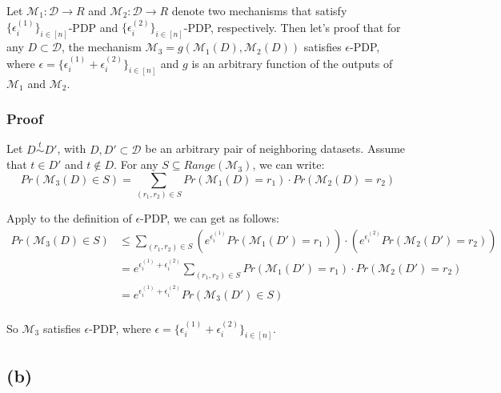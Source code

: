 \documentclass[a4paper,12pt]{article}
\begin{document}
Let $\mathcal{M}_1: \mathcal{D} \to R$ and $\mathcal{M}_2: \mathcal{D} \to R$ denote two mechanisms that satisfy $\{\epsilon_{i}^{(1)}\}_{i\in [n]}$-PDP and $\{\epsilon_{i}^{(2)}\}_{i\in [n]}$-PDP, respectively. Then let's proof that for any $D \subset \mathcal{D}$, the mechanism $\mathcal{M}_3 = g(\mathcal{M}_1(D), \mathcal{M}_2(D))$ satisfies $\epsilon$-PDP, where $\epsilon = \{\epsilon_{i}^{(1)} + \epsilon_{i}^{(2)}\}_{i\in [n]}$ and $g$ is an arbitrary function of the outputs of $\mathcal{M}_1$ and $\mathcal{M}_2$.
\subsubsection{Proof}
Let $D \overset{t}{\sim} D'$, with $D, D' \subset \mathcal{D}$ be an arbitrary pair of neighboring datasets. Assume that $t \in D'$ and $t \notin D$. For any $S \subseteq Range(\mathcal{M}_3)$, we can write:
\begin{equation}
    Pr(\mathcal{M}_3(D) \in S) = \sum_{(r_1, r_2) \in S} Pr(\mathcal{M}_1(D) = r_1)\cdot Pr(\mathcal{M}_2(D) = r_2)
\end{equation}

Apply to the definition of $\epsilon$-PDP, we can get as follows:
\begin{equation}
    \begin{aligned}
        Pr(\mathcal{M}_3(D) \in S) & \leq \sum_{(r_1, r_2) \in S} (e^{\epsilon_{i}^{(1)}} Pr(\mathcal{M}_1(D') = r_1))\cdot (e^{\epsilon_{i}^{(2)}} Pr(\mathcal{M}_2(D') = r_2)) \\
                                   & = e^{\epsilon_{i}^{(1)} + \epsilon_{i}^{(2)}}\sum_{(r_1, r_2) \in S} Pr(\mathcal{M}_1(D') = r_1)\cdot Pr(\mathcal{M}_2(D') = r_2)           \\
                                   & = e^{\epsilon_{i}^{(1)} + \epsilon_{i}^{(2)}} Pr(\mathcal{M}_3(D') \in S)                                                                   \\
    \end{aligned}
\end{equation}

So $\mathcal{M}_3$ satisfies $\epsilon$-PDP, where $\epsilon = \{\epsilon_{i}^{(1)} + \epsilon_{i}^{(2)}\}_{i\in [n]}$.
\subsection{(b)}
\end{document}
